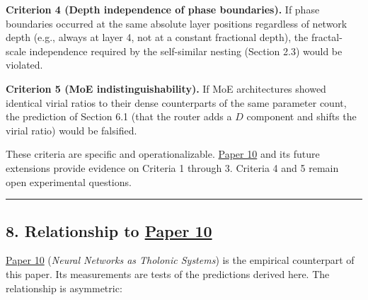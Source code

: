 \documentclass[12pt]{article}
\begin{document}
\textbf{Criterion 4 (Depth independence of phase boundaries).} If phase
boundaries occurred at the same absolute layer positions regardless of
network depth (e.g., always at layer 4, not at a constant fractional
depth), the fractal-scale independence required by the self-similar
nesting (Section 2.3) would be violated.

\textbf{Criterion 5 (MoE indistinguishability).} If MoE architectures
showed identical virial ratios to their dense counterparts of the same
parameter count, the prediction of Section 6.1 (that the router adds a
\(D\) component and shifts the virial ratio) would be falsified.

These criteria are specific and operationalizable.
\href{https://github.com/baardev/truevalue/blob/main/docnav/Research/papers/10_tholonic-neural-architecture/10_tholonic-neural-architecture.pdf}{Paper
10} and its future extensions provide evidence on Criteria 1 through 3.
Criteria 4 and 5 remain open experimental questions.

\begin{center}\rule{0.5\linewidth}{0.5pt}\end{center}

\subsection{\texorpdfstring{8. Relationship to
\href{https://github.com/baardev/truevalue/blob/main/docnav/Research/papers/10_tholonic-neural-architecture/10_tholonic-neural-architecture.pdf}{Paper
10}}{8. Relationship to Paper 10}}\label{relationship-to-paper-10}

\href{https://github.com/baardev/truevalue/blob/main/docnav/Research/papers/10_tholonic-neural-architecture/10_tholonic-neural-architecture.pdf}{Paper
10} (\emph{Neural Networks as Tholonic Systems}) is the empirical
counterpart of this paper. Its measurements are tests of the predictions
derived here. The relationship is asymmetric:
\end{document}
